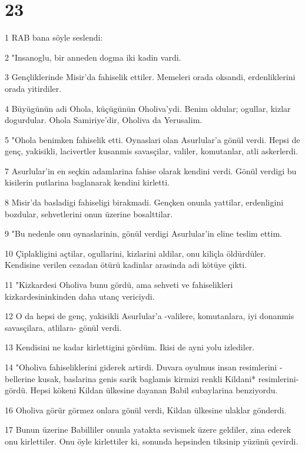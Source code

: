 \chapter{23}

\par 1 RAB bana söyle seslendi:
\par 2 "Insanoglu, bir anneden dogma iki kadin vardi.
\par 3 Gençliklerinde Misir'da fahiselik ettiler. Memeleri orada oksandi, erdenliklerini orada yitirdiler.
\par 4 Büyügünün adi Ohola, küçügünün Oholiva'ydi. Benim oldular; ogullar, kizlar dogurdular. Ohola Samiriye'dir, Oholiva da Yerusalim.
\par 5 "Ohola benimken fahiselik etti. Oynaslari olan Asurlular'a gönül verdi. Hepsi de genç, yakisikli, lacivertler kusanmis savasçilar, valiler, komutanlar, atli askerlerdi.
\par 7 Asurlular'in en seçkin adamlarina fahise olarak kendini verdi. Gönül verdigi bu kisilerin putlarina baglanarak kendini kirletti.
\par 8 Misir'da basladigi fahiseligi birakmadi. Gençken onunla yattilar, erdenligini bozdular, sehvetlerini onun üzerine bosalttilar.
\par 9 "Bu nedenle onu oynaslarinin, gönül verdigi Asurlular'in eline teslim ettim.
\par 10 Çiplakligini açtilar, ogullarini, kizlarini aldilar, onu kiliçla öldürdüler. Kendisine verilen cezadan ötürü kadinlar arasinda adi kötüye çikti.
\par 11 "Kizkardesi Oholiva bunu gördü, ama sehveti ve fahiselikleri kizkardesininkinden daha utanç vericiydi.
\par 12 O da hepsi de genç, yakisikli Asurlular'a -valilere, komutanlara, iyi donanmis savasçilara, atlilara- gönül verdi.
\par 13 Kendisini ne kadar kirlettigini gördüm. Ikisi de ayni yolu izlediler.
\par 14 "Oholiva fahiseliklerini giderek artirdi. Duvara oyulmus insan resimlerini -bellerine kusak, baslarina genis sarik baglamis kirmizi renkli Kildani* resimlerini- gördü. Hepsi kökeni Kildan ülkesine dayanan Babil subaylarina benziyordu.
\par 16 Oholiva görür görmez onlara gönül verdi, Kildan ülkesine ulaklar gönderdi.
\par 17 Bunun üzerine Babilliler onunla yatakta sevismek üzere geldiler, zina ederek onu kirlettiler. Onu öyle kirlettiler ki, sonunda hepsinden tiksinip yüzünü çevirdi.
